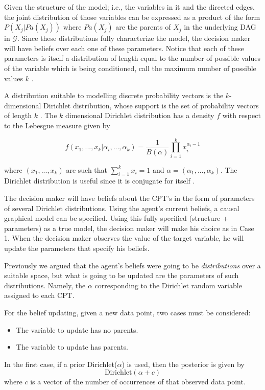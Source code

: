 \documentclass[english,letterpaper,12pt,final]{article}
\theoremstyle{definition}
\begin{document}
Given the structure of the model; i.e., the variables in it and the directed edges, the joint distribution of those variables can be expressed as a product of the form $P(X_j | Pa(X_j))$ where $Pa(X_j)$ are the parents of $X_j$ in the underlying DAG in $\mathcal{G}$. Since these distributions fully characterize the model, the decision maker will have beliefs over each one of these parameters. Notice that each of these parameters is itself a distribution of length equal to the number of possible values of the variable which is being conditioned, call the maximum number of possible values $k$ . 

A distribution suitable to modelling discrete probability vectors is the $k$-dimensional Dirichlet distribution, whose support is the set of probability vectors of length $k$ \cite{hjort2010bayesian}. The $k$ dimensional Dirichlet distribution has a density $f$ with respect to the Lebesgue measure given by

\[ f(x_1,...,x_k | \alpha_i,...,\alpha_k)=\frac{1}{B(\alpha)}  \prod_{i=1}^k x_i^{\alpha_i-1}\]

where $(x_1,...,x_k)$ are such that $\sum_{i=1}^k x_i =1$ and $\alpha=(\alpha_1,...,\alpha_k)$. The Dirichlet distribution is useful since it is conjugate for itself \cite{bernardo2000bayesian}.

The decision maker will have beliefs about the CPT's in the form of parameters of several Dirichlet distributions. Using the agent's current beliefs, a causal graphical model can be specified. Using this fully specified (structure + parameters) as a true model, the decision maker will make his choice as in Case 1. When the decision maker observes the value of the target variable, he will update the parameters that specify his beliefs.

Previously we argued that the agent's beliefs were going to be \textit{distributions} over a suitable space, but what is going to be updated are the parameters of such distributions. Namely, the $\alpha$ corresponding to the Dirichlet random variable assigned to each CPT.

For the belief updating, given a new data point,  two cases must be considered:
\begin{itemize}
\item The variable to update has no parents.
\item The variable to update has parents.
\end{itemize}

In the first case, if a prior Dirichlet($\alpha$) is used, then the posterior is given by
\[ \textrm{Dirichlet}(\alpha + c) \]
where $c$ is a vector of the number of occurrences of that observed data point. 
\end{document}

